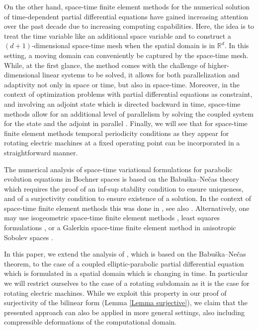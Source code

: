 \documentclass[12pt]{article}
\numberwithin{equation}{section}
\begin{document}
On the other hand, space-time finite element methods \cite{StYa19} for
the numerical solution of time-dependent partial differential equations
have gained increasing attention over the past decade due to increasing
computing capabilities. Here, the idea is to treat the time variable like
an additional space variable and to construct a $(d+1)$-dimensional
space-time mesh when the spatial domain is in $\mathbb R^d$. In this setting,
a moving domain can conveniently be captured by the space-time mesh. While,
at the first glance, the method comes with the challenge of higher-dimensional
linear systems to be solved, it allows for both parallelization
\cite{GanderNeumueller2016} and adaptivity
\cite{LangerSchafelner2020, SteinbachYang2018} not only in space or time,
but also in space-time. Moreover, in the context of optimization problems
with partial differential equations as constraint, and involving an adjoint
state which is directed backward in time, space-time methods allow for an
additional level of parallelism by solving the coupled system for the state
and the adjoint in parallel \cite{LSTY2021}. Finally, we will see that for
space-time finite element methods temporal periodicity conditions as they
appear for rotating electric machines at a fixed operating point can be
incorporated in a straightforward manner.

The numerical analysis of space-time variational formulations for parabolic
evolution equations in Bochner spaces is based on the
Babu\v{s}ka--Ne\v{c}as theory \cite{BaAz72,Ne62} which requires the
proof of an inf-sup stability condition to ensure uniqueness, and
of a surjectivity condition to ensure existence of a solution.
In the context of space-time finite element methods this was done
in \cite{SchwabStevenson:2009}, see also
\cite{Andreev,St15,UrbanPatera}. Alternatively, one may use isogeometric
space-time finite element methods \cite{LangerMooreNeumueller2016},
least squares formulations \cite{StevensonWesterdiep:2021}, or
a Galerkin space-time finite element method in anisotropic
Sobolev spaces \cite{SteinbachZank}.

In this paper, we extend the analysis of \cite{St15}, which is based on
the Babu\v ska--Ne\v cas theorem, to the case of a coupled elliptic-parabolic
partial differential equation which is formulated in a spatial domain
which is changing in time. In particular we will restrict ourselves to the
case of a rotating subdomain as it is the case for rotating electric machines.
While we exploit this property in our proof of surjectivity of the bilinear
form (Lemma \ref{Lemma surjective}), we claim that the presented approach
can also be applied in more general settings, also including compressible
deformations of the computational domain.
\end{document}
